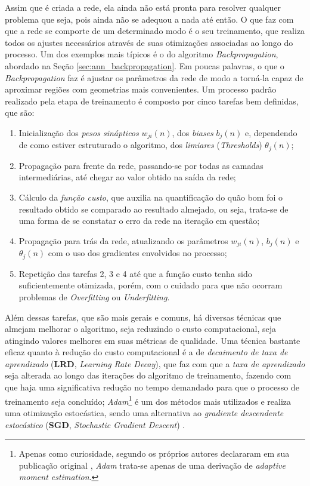 Assim que é criada a rede, ela ainda não está pronta para resolver qualquer problema que seja, pois ainda não se adequou a nada até então. O que faz com que a rede se comporte de um determinado modo é o seu treinamento, que realiza todos os ajustes necessários através de suas otimizações associadas ao longo do processo. Um dos exemplos mais típicos é o do algoritmo \textit{Backpropagation}, abordado na Seção \ref{sec:ann_backpropagation}. Em poucas palavras, o que o \textit{Backpropagation} faz é ajustar os parâmetros da rede de modo a torná-la capaz de aproximar regiões com geometrias mais convenientes. Um processo padrão realizado pela etapa de treinamento é composto por cinco tarefas bem definidas, que são:

\begin{enumerate}
    \item Inicialização dos \textit{pesos sinápticos} $w_{ji}(n)$, dos \textit{biases} $b_j(n)$ e, dependendo de como estiver estruturado o algoritmo, dos \textit{limiares} (\textit{Thresholds}) $\theta_{j}(n)$; \\
    \item Propagação para frente da rede, passando-se por todas as camadas intermediárias, até chegar ao valor obtido na saída da rede; \\
    \item Cálculo da \textit{função custo}, que auxilia na quantificação do quão bom foi o resultado obtido se comparado ao resultado almejado, ou seja, trata-se de uma forma de se constatar o erro da rede na iteração em questão; \\
    \item Propagação para trás da rede, atualizando os parâmetros $w_{ji}(n)$, $b_j(n)$ e $\theta_{j}(n)$ com o uso dos gradientes envolvidos no processo; \\
    \item Repetição das tarefas 2, 3 e 4 até que a função custo tenha sido suficientemente otimizada, porém, com o cuidado para que não ocorram problemas de \textit{Overfitting} ou \textit{Underfitting}.
\end{enumerate}

Além dessas tarefas, que são mais gerais e comuns, há diversas técnicas que almejam melhorar o algoritmo, seja reduzindo o custo computacional, seja atingindo valores melhores em suas métricas de qualidade. Uma técnica bastante eficaz quanto à redução do custo computacional é a de \textit{decaimento de taxa de aprendizado} (\textbf{LRD}, \textit{Learning Rate Decay}), que faz com que a \textit{taxa de aprendizado} seja alterada ao longo das iterações do algoritmo de treinamento, fazendo com que haja uma significativa redução no tempo demandado para que o processo de treinamento seja concluído; \textit{Adam}\footnote{Apenas como curiosidade, segundo os próprios autores declararam em sua publicação original \citep{kingma2014adam}, \textit{Adam} trata-se apenas de uma derivação de \textit{adaptive moment estimation}.} \citep{kingma2014adam} é um dos métodos mais utilizados e realiza uma otimização estocástica, sendo uma alternativa ao \textit{gradiente descendente estocástico} (\textbf{SGD}, \textit{Stochastic Gradient Descent}) \citep{robbins1951stochastic, kiefer1952stochastic}.

